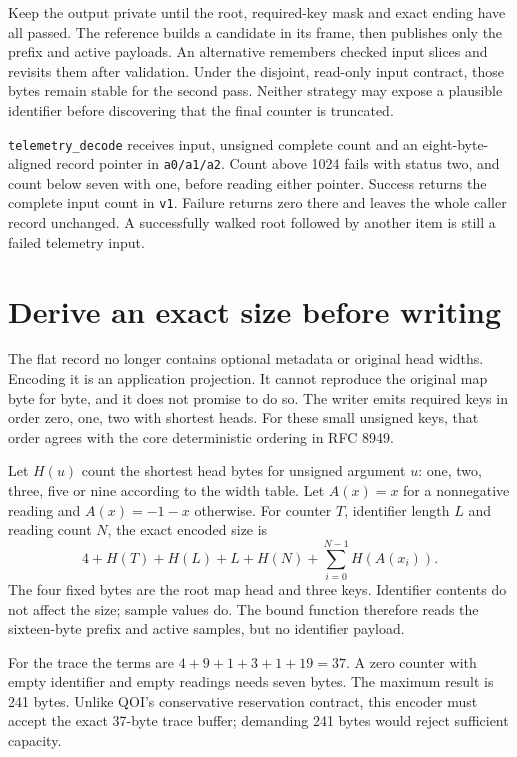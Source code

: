 Keep the output private until the root, required-key mask and exact ending have
all passed. The reference builds a candidate in its frame, then publishes only
the prefix and active payloads. An alternative remembers checked input slices
and revisits them after validation. Under the disjoint, read-only input contract,
those bytes remain stable for the second pass. Neither strategy may expose a
plausible identifier before discovering that the final counter is truncated.

\texttt{telemetry\_decode} receives input, unsigned complete count and an
eight-byte-aligned record pointer in \texttt{a0/a1/a2}. Count above 1024 fails
with status two, and count below seven with one, before reading either pointer.
Success returns the complete input count in \texttt{v1}. Failure returns zero
there and leaves the whole caller record unchanged. A successfully walked root
followed by another item is still a failed telemetry input.

\section{Derive an exact size before writing}

The flat record no longer contains optional metadata or original head widths.
Encoding it is an application projection. It cannot reproduce the original map
byte for byte, and it does not promise to do so. The writer emits required keys
in order zero, one, two with shortest heads. For these small unsigned keys,
that order agrees with the core deterministic ordering in RFC 8949.

Let $H(u)$ count the shortest head bytes for unsigned argument $u$: one, two,
three, five or nine according to the width table. Let $A(x)=x$ for a nonnegative
reading and $A(x)=-1-x$ otherwise. For counter $T$, identifier length $L$ and
reading count $N$, the exact encoded size is
\[
  4+H(T)+H(L)+L+H(N)+\sum_{i=0}^{N-1}H(A(x_i)).
\]
The four fixed bytes are the root map head and three keys. Identifier contents
do not affect the size; sample values do. The bound function therefore reads
the sixteen-byte prefix and active samples, but no identifier payload.

For the trace the terms are $4+9+1+3+1+19=37$. A zero counter with empty identifier
and empty readings needs seven bytes. The maximum result is 241 bytes. Unlike
QOI's conservative reservation contract, this encoder must accept the exact
37-byte trace buffer; demanding 241 bytes would reject sufficient capacity.

